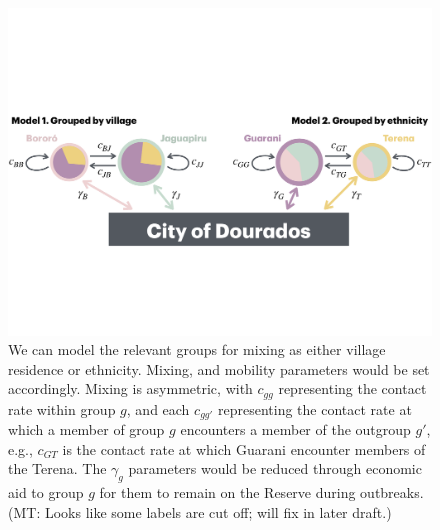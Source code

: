 \documentclass[
  letterpaper,
  abstract]{scrartcl}
\newcommand{\mt}[1]{{\textcolor{myorange} {({\tiny MT:} #1)}}}
\begin{document}
\begin{figure}[H]

\caption{
  We can model the relevant groups for mixing as either village
residence or ethnicity. Mixing, and mobility parameters
would be set accordingly. Mixing is asymmetric, with $c_{gg}$ representing the
contact rate within group $g$, and each $c_{gg'}$ representing
the contact rate at which a member of group $g$ encounters a member of the
outgroup $g'$, e.g., $c_{GT}$ is the contact rate at which Guarani encounter
members of the Terena. The $\gamma_g$ parameters would be reduced through
economic aid to group $g$ for them to remain on the Reserve during
outbreaks. \mt{Looks like some labels are cut off; will fix in later draft.}}
\label{fig:ModelSketch}
\vspace{0.3em}
{\centering \includegraphics{Figures/ModelSketch.pdf}

}
\end{figure}%
\end{document}
